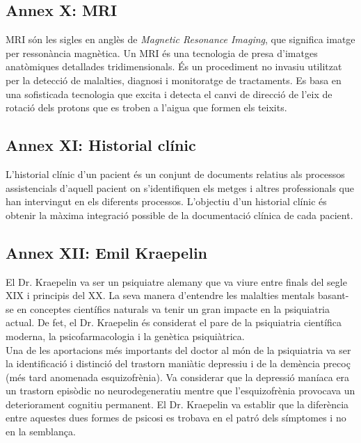 \documentclass[a4paper,12pt]{article}
\begin{document}
\subsection*{Annex X: MRI}
MRI són les sigles en anglès de \textit{Magnetic Resonance Imaging}, que significa imatge per ressonància magnètica. Un MRI és una tecnologia de presa d'imatges anatòmiques detallades tridimensionals. És un procediment no invasiu utilitzat per la detecció de malalties, diagnosi i monitoratge de tractaments. Es basa en una sofisticada tecnologia que excita i detecta el canvi de direcció de l'eix de rotació dels protons que es troben a l'aigua que formen els teixits.
\subsection*{Annex XI: Historial clínic}
L'historial clínic d'un pacient és un conjunt de documents relatius als processos assistencials d'aquell pacient on s'identifiquen els metges i altres professionals que han intervingut en els diferents processos. L'objectiu d'un historial clínic és obtenir la màxima integració possible de la documentació clínica de cada pacient.
\subsection*{Annex XII: Emil Kraepelin}
El Dr. Kraepelin va ser un psiquiatre alemany que va viure entre finals del segle XIX i principis del XX. La seva manera d'entendre les malalties mentals basant-se en conceptes científics naturals va tenir un gran impacte en la psiquiatria actual. De fet, el Dr. Kraepelin és considerat el pare de la psiquiatria científica moderna, la psicofarmacologia i la genètica psiquiàtrica.\\
Una de les aportacions més importants del doctor al món de la psiquiatria va ser la identificació i distinció del trastorn maniàtic depressiu i de la demència precoç (més tard anomenada esquizofrènia). Va considerar que la depressió maníaca era un trastorn episòdic no neurodegeneratiu mentre que l'esquizofrènia provocava un deteriorament cognitiu permanent. El Dr. Kraepelin va establir que la diferència entre aquestes dues formes de psicosi es trobava en el patró dels símptomes i no en la semblança.
\end{document}
